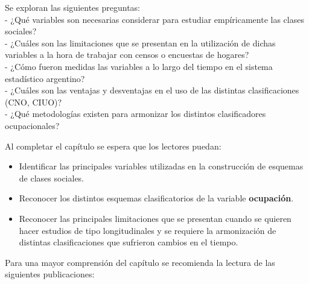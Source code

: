 \documentclass[
]{article}
\providecommand{\tightlist}{%
  \setlength{\itemsep}{0pt}\setlength{\parskip}{0pt}}
\begin{document}
Se exploran las siguientes preguntas:\\
- ¿Qué variables son necesarias considerar para estudiar empíricamente las clases sociales?\\
- ¿Cuáles son las limitaciones que se presentan en la utilización de dichas variables a la hora de trabajar con censos o encuestas de hogares?\\
- ¿Cómo fueron medidas las variables a lo largo del tiempo en el sistema estadístico argentino?\\
- ¿Cuáles son las ventajas y desventajas en el uso de las distintas clasificaciones (CNO, CIUO)?\\
- ¿Qué metodologías existen para armonizar los distintos clasificadores ocupacionales?

Al completar el capítulo se espera que los lectores puedan:

\begin{itemize}
\tightlist
\item
  Identificar las principales variables utilizadas en la construcción de esquemas de clases sociales.
\item
  Reconocer los distintos esquemas clasificatorios de la variable \textbf{ocupación}.
\item
  Reconocer las principales limitaciones que se presentan cuando se quieren hacer estudios de tipo longitudinales y se requiere la armonización de distintas clasificaciones que sufrieron cambios en el tiempo.
\end{itemize}

Para una mayor comprensión del capítulo se recomienda la lectura de las siguientes publicaciones:
\end{document}
